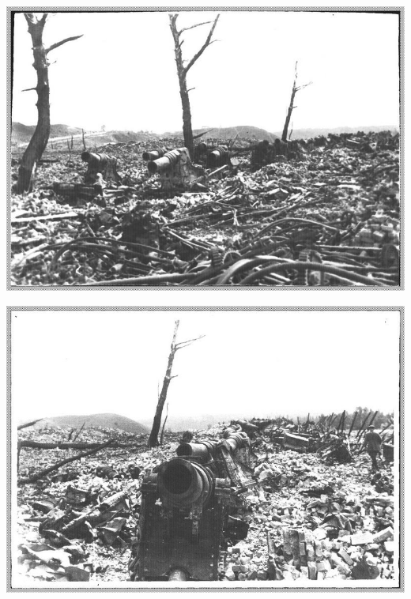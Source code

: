 \begin{center}
\includegraphics[width=\textwidth]{chast-vosp/zver/vz004.jpg}
\end{center}
\vspace*{\fill}

\newpage

\vspace*{\fill}
\begin{center}
\includegraphics[width=\textwidth]{chast-vosp/zver/vz005.jpg}
\end{center}

